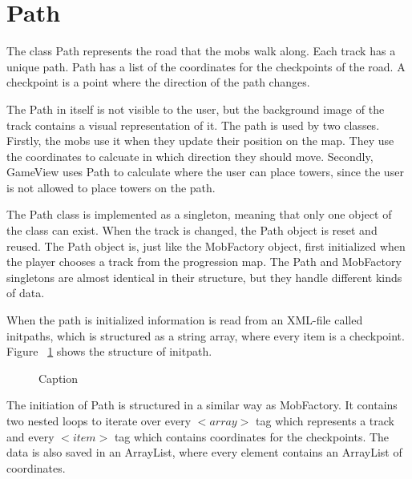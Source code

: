 \section{Path}

The class Path represents the road that the mobs walk along. Each track has a unique path. Path has a list of the coordinates for the checkpoints of the road. A checkpoint is a point where the direction of the path changes. 

The Path in itself is not visible to the user, but the background image of the track contains a visual representation of it. The path is used by two classes. Firstly, the mobs use it when they update their position on the map. They use the coordinates to calcuate in which direction they should move. Secondly, GameView uses Path to calculate where the user can place towers, since the user is not allowed to place towers on the path.

The Path class is implemented as a singleton, meaning that only one object of the class can exist. When the track is changed, the Path object is reset and reused. The Path object is, just like the MobFactory object, first initialized when the player chooses a track from the progression map. The Path and MobFactory singletons are almost identical in their structure, but they handle different kinds of data.

When the path is initialized information is read from an XML-file called initpaths, which is structured as a string array, where every item is a checkpoint. Figure ~\ref{fig:codeExInitPathXML} shows the structure of initpath.

\begin{figure}[htb]

\begin{small}

\end{small}

\caption{Caption}
\label{fig:codeExInitPathXML}

\end{figure}

The initiation of Path is structured in a similar way as MobFactory. It contains two nested loops to iterate over every \begin{math} <array> \end{math} tag which represents a track and every \begin{math} <item> \end{math} tag which contains coordinates for the checkpoints. The data is also saved in an ArrayList, where every element contains an ArrayList of coordinates.

